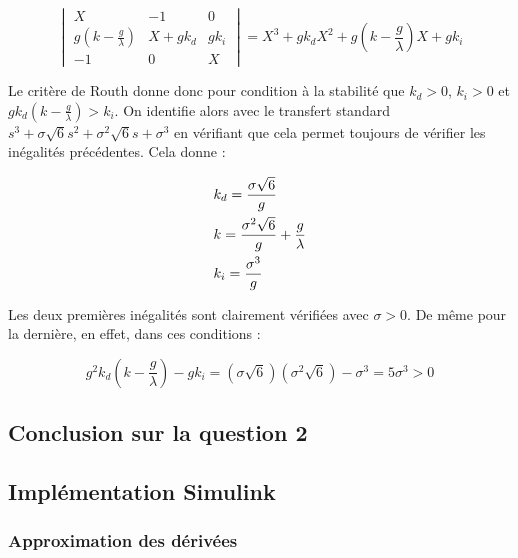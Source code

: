 \documentclass[10pt]{article}
\begin{document}
\[
	\begin{vmatrix}
		X & - 1 & 0 \\
		g ( k - \frac{g}{\lambda} ) & X + g k_d & g k_i \\
		- 1 & 0 & X
	\end{vmatrix}
	= X^3 + g k_d X^2 + g ( k - \frac{g}{\lambda} ) X + g k_i
\]

\vspace{10px}

\noindent Le critère de Routh donne donc pour condition à la stabilité que $k_d > 0$, $k_i > 0$ et
$g k_d ( k - \frac{g}{\lambda} )  > k_i$. On identifie alors avec le transfert standard
$s^3 + \sigma \sqrt 6 s^2 + \sigma^2 \sqrt 6 s + \sigma^3$ en vérifiant que cela permet toujours de vérifier les
inégalités précédentes. Cela donne :

\begin{align}
	&k_d = \frac{\sigma \sqrt 6}{g} \notag \\
	&k = \frac{\sigma^2 \sqrt 6}{g} + \frac{g}{\lambda} \notag \\
	&k_i = \frac{\sigma^3}{g} \notag
\end{align}

\noindent Les deux premières inégalités sont clairement vérifiées avec $\sigma > 0$. De même pour la dernière,
en effet, dans ces conditions :

\[
	g^2 k_d ( k - \frac{g}{\lambda} )  - g k_i = ( \sigma \sqrt 6 ) ( \sigma^2 \sqrt 6 ) - \sigma^3 = 5 \sigma^3 > 0
\]

\subsection*{Conclusion sur la question 2}


\subsection*{Implémentation Simulink}

\subsubsection*{Approximation des dérivées}
\end{document}
